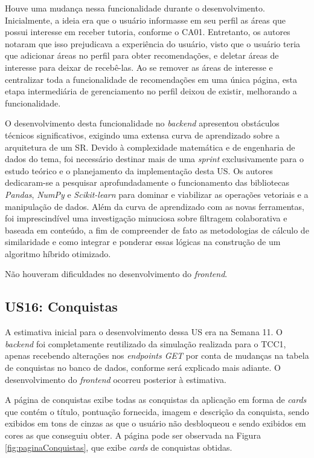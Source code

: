 Houve uma mudança nessa funcionalidade durante o desenvolvimento. Inicialmente, a ideia era que o usuário informasse em seu perfil as áreas que possui interesse em receber tutoria, conforme o CA01. Entretanto, os autores notaram que isso prejudicava a experiência do usuário, visto que o usuário teria que adicionar áreas no perfil para obter recomendações, e deletar áreas de interesse para deixar de recebê-las. Ao se remover as áreas de interesse e centralizar toda a funcionalidade de recomendações em uma única página, esta etapa intermediária de gerenciamento no perfil deixou de existir, melhorando a funcionalidade.

O desenvolvimento desta funcionalidade no \textit{backend} apresentou obstáculos técnicos significativos, exigindo uma extensa curva de aprendizado sobre a arquitetura de um SR. Devido à complexidade matemática e de engenharia de dados do tema, foi necessário destinar mais de uma \textit{sprint} exclusivamente para o estudo teórico e o planejamento da implementação desta US. Os autores dedicaram-se a pesquisar aprofundadamente o funcionamento das bibliotecas \textit{Pandas}, \textit{NumPy} e \textit{Scikit-learn} para dominar e viabilizar as operações vetoriais e a manipulação de dados. Além da curva de aprendizado com as novas ferramentas, foi imprescindível uma investigação minuciosa sobre filtragem colaborativa e baseada em conteúdo, a fim de compreender de fato as metodologias de cálculo de similaridade e como integrar e ponderar essas lógicas na construção de um algoritmo híbrido otimizado.

Não houveram dificuldades no desenvolvimento do \textit{frontend}.

\subsection[US16: Conquistas]{US16: Conquistas}

A estimativa inicial para o desenvolvimento dessa US era na Semana 11. O \textit{backend} foi completamente reutilizado da simulação realizada para o TCC1, apenas recebendo alterações nos \textit{endpoints GET} por conta de mudanças na tabela de conquistas no banco de dados, conforme será explicado mais adiante. O desenvolvimento do \textit{frontend} ocorreu posterior à estimativa.

A página de conquistas exibe todas as conquistas da aplicação em forma de \textit{cards} que contém o título, pontuação fornecida, imagem e descrição da conquista, sendo exibidos em tons de cinzas as que o usuário não desbloqueou e sendo exibidos em cores as que conseguiu obter. A página pode ser observada na Figura \ref{fig:paginaConquistas}, que exibe \textit{cards} de conquistas obtidas.


